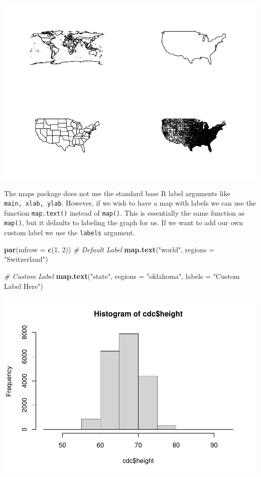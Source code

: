 \documentclass[
]{book}
\newenvironment{Shaded}{\begin{snugshade}}{\end{snugshade}}
\newcommand{\CommentTok}[1]{\textcolor[rgb]{0.56,0.35,0.01}{\textit{#1}}}
\newcommand{\DataTypeTok}[1]{\textcolor[rgb]{0.13,0.29,0.53}{#1}}
\newcommand{\DecValTok}[1]{\textcolor[rgb]{0.00,0.00,0.81}{#1}}
\newcommand{\KeywordTok}[1]{\textcolor[rgb]{0.13,0.29,0.53}{\textbf{#1}}}
\newcommand{\NormalTok}[1]{#1}
\newcommand{\StringTok}[1]{\textcolor[rgb]{0.31,0.60,0.02}{#1}}
\begin{document}
\includegraphics{_main_files/figure-latex/unnamed-chunk-195-1.pdf}

The maps package does not use the standard base R label arguments like \texttt{main,\ xlab,\ ylab}. However, if we wish to have a map with labels we can use the function \texttt{map.text()} instead of \texttt{map()}. This is essentially the same function as \texttt{map()}, but it defaults to labeling the graph for us. If we want to add our own custom label we use the \texttt{labels} argument.

\begin{Shaded}
\begin{Highlighting}[]
\KeywordTok{par}\NormalTok{(}\DataTypeTok{mfrow =} \KeywordTok{c}\NormalTok{(}\DecValTok{1}\NormalTok{, }\DecValTok{2}\NormalTok{))}
\CommentTok{# Default Label}
\KeywordTok{map.text}\NormalTok{(}\StringTok{"world"}\NormalTok{, }\DataTypeTok{regions =} \StringTok{"Switzerland"}\NormalTok{)}

\CommentTok{# Custom Label}
\KeywordTok{map.text}\NormalTok{(}\StringTok{"state"}\NormalTok{, }\DataTypeTok{regions =} \StringTok{"oklahoma"}\NormalTok{,}
    \DataTypeTok{labels =} \StringTok{"Custom Label Here"}\NormalTok{)}
\end{Highlighting}
\end{Shaded}

\includegraphics{_main_files/figure-latex/unnamed-chunk-196-1.pdf}
\end{document}
